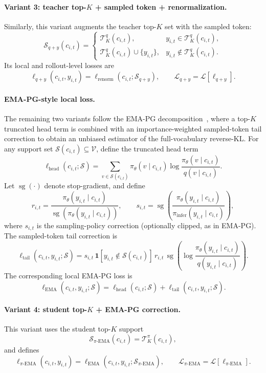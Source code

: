 \documentclass{article}
\begin{document}
\paragraph{Variant 3: teacher top-$K$ + sampled token + renormalization.}
Similarly, this variant augments the teacher top-$K$ set with the sampled token:
\[
\mathcal S_{q+y}(c_{i,t})
=
\begin{cases}
\mathcal T_K^q(c_{i,t}), & y_{i,t} \in \mathcal T_K^q(c_{i,t}),\\[4pt]
\mathcal T_K^q(c_{i,t}) \cup \{y_{i,t}\}, & y_{i,t} \notin \mathcal T_K^q(c_{i,t}).
\end{cases}
\]
Its local and rollout-level losses are
\[
\ell_{q+y}(c_{i,t}, y_{i,t})
=
\ell_{\mathrm{renorm}}(c_{i,t}; \mathcal S_{q+y}),
\qquad
\mathcal L_{q+y} = \mathcal L[\ell_{q+y}].
\]

\paragraph{EMA-PG-style local loss.}
The remaining two variants follow the EMA-PG decomposition~\citep{emapg2026}, where a top-$K$ truncated head term is combined with an importance-weighted sampled-token tail correction to obtain an unbiased estimator of the full-vocabulary reverse-KL. For any support set $\mathcal S(c_{i,t}) \subseteq \mathcal V$, define the truncated head term
\[
\ell_{\mathrm{head}}(c_{i,t}; \mathcal S)
=
\sum_{v \in \mathcal S(c_{i,t})}
\pi_\theta(v \mid c_{i,t})
\log
\frac{\pi_\theta(v \mid c_{i,t})}{q(v \mid c_{i,t})}.
\]
Let $\operatorname{sg}(\cdot)$ denote stop-gradient, and define
\[
r_{i,t}
=
\frac{\pi_\theta(y_{i,t} \mid c_{i,t})}
{\operatorname{sg}\!\left(\pi_\theta(y_{i,t} \mid c_{i,t})\right)},
\qquad
s_{i,t}
=
\operatorname{sg}\!\left(
\frac{\pi_\theta(y_{i,t} \mid c_{i,t})}
{\pi_{\mathrm{infer}}(y_{i,t} \mid c_{i,t})}
\right),
\]
where $s_{i,t}$ is the sampling-policy correction (optionally clipped, as in EMA-PG). The sampled-token tail correction is
\[
\ell_{\mathrm{tail}}(c_{i,t}, y_{i,t}; \mathcal S)
=
s_{i,t}\,
\mathbf 1\!\left[y_{i,t} \notin \mathcal S(c_{i,t})\right]\,
r_{i,t}\,
\operatorname{sg}\!\left(
\log
\frac{\pi_\theta(y_{i,t} \mid c_{i,t})}
{q(y_{i,t} \mid c_{i,t})}
\right).
\]
The corresponding local EMA-PG loss is
\[
\ell_{\mathrm{EMA}}(c_{i,t}, y_{i,t}; \mathcal S)
=
\ell_{\mathrm{head}}(c_{i,t}; \mathcal S)
+
\ell_{\mathrm{tail}}(c_{i,t}, y_{i,t}; \mathcal S).
\]

\paragraph{Variant 4: student top-$K$ + EMA-PG correction.}
This variant uses the student top-$K$ support
\[
\mathcal S_{\pi\text{-EMA}}(c_{i,t}) = \mathcal T_K^\pi(c_{i,t}),
\]
and defines
\[
\ell_{\pi\text{-EMA}}(c_{i,t}, y_{i,t})
=
\ell_{\mathrm{EMA}}(c_{i,t}, y_{i,t}; \mathcal S_{\pi\text{-EMA}}),
\qquad
\mathcal L_{\pi\text{-EMA}} = \mathcal L[\ell_{\pi\text{-EMA}}].
\]
\end{document}
